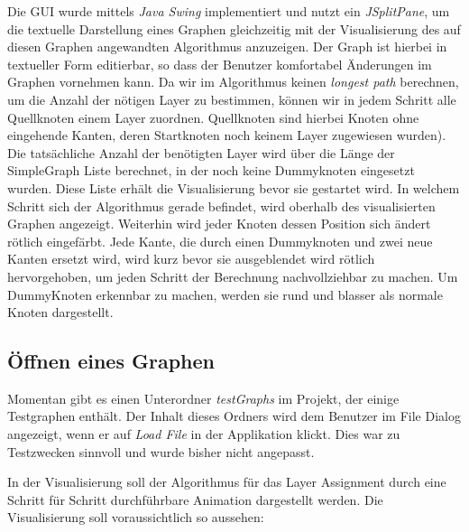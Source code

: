 
Die GUI wurde mittels \textit{Java Swing} implementiert und nutzt ein \textit{JSplitPane}, um die textuelle Darstellung eines Graphen gleichzeitig mit der Visualisierung des auf diesen Graphen angewandten Algorithmus anzuzeigen. Der Graph ist hierbei in textueller Form editierbar, so dass der Benutzer komfortabel Änderungen im Graphen vornehmen kann.
\newline 
Da wir im Algorithmus keinen \textit{longest path} berechnen, um die Anzahl der nötigen Layer zu bestimmen, können wir in jedem Schritt alle Quellknoten einem Layer zuordnen. Quellknoten sind hierbei Knoten ohne eingehende Kanten, deren Startknoten noch keinem Layer zugewiesen wurden). Die tatsächliche Anzahl der benötigten Layer wird über die Länge der SimpleGraph Liste berechnet, in der noch keine Dummyknoten eingesetzt wurden. Diese Liste erhält die  Visualisierung bevor sie gestartet wird.
\newline 
In welchem Schritt sich der Algorithmus gerade befindet, wird oberhalb des visualisierten Graphen angezeigt. Weiterhin wird jeder Knoten dessen Position sich ändert rötlich eingefärbt. Jede Kante, die durch einen Dummyknoten und zwei neue Kanten ersetzt wird, wird kurz bevor sie ausgeblendet wird rötlich hervorgehoben, um jeden Schritt der Berechnung nachvollziehbar zu machen. Um DummyKnoten erkennbar zu machen, werden sie rund und blasser als normale Knoten dargestellt.

\subsection*{Öffnen eines Graphen}
Momentan gibt es einen Unterordner \textit{testGraphs} im Projekt, der einige Testgraphen enthält. Der Inhalt dieses Ordners wird dem Benutzer im File Dialog angezeigt, wenn er auf \textit{Load File} in der Applikation klickt. Dies war zu Testzwecken sinnvoll und wurde bisher nicht angepasst.

In der Visualisierung soll der Algorithmus für das Layer Assignment durch eine Schritt für Schritt durchführbare Animation dargestellt werden. Die Visualisierung soll voraussichtlich so aussehen:

